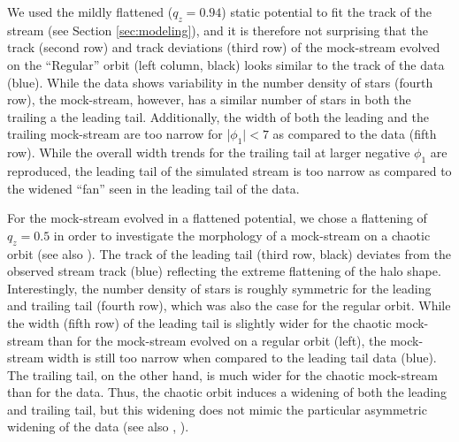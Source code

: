 \documentclass[twocolumn]{aastex62}
\newcommand{\sa}[1]{{\color{magenta} SP: #1}}
\begin{document}
\begin{figure}
{%
}
\label{fig:sims}
\end{figure}


We used the mildly flattened ($q_z = 0.94$) static potential to fit the track of the stream (see Section \ref{sec:modeling}), and it is therefore not surprising that the track (second row) and track deviations (third row) of the mock-stream evolved on the ``Regular'' orbit (left column, black) looks similar to the track of the data (blue).
While the data shows variability in the number density of stars (fourth row), the mock-stream, however, has a similar number of stars in both the trailing a the leading tail.
Additionally, the width of both the leading and the trailing mock-stream are too narrow for |$\phi_1| < 7$ as compared to the data (fifth row).
While the overall width trends for the trailing tail  at larger negative $\phi_1$ are reproduced, the leading tail of the simulated stream is too narrow as compared to the widened ``fan'' seen in the leading tail of the data.

For the mock-stream evolved in a flattened potential,
we chose a flattening of $q_z = 0.5$  in order to investigate the morphology of a mock-stream on a chaotic orbit (see also \citealt{Fardal:2015}).
The track of the leading tail (third row, black) deviates from the observed stream track (blue) reflecting the extreme flattening of the halo shape.
Interestingly, the number density of stars is roughly symmetric for the leading and trailing tail  (fourth row), which was also the case for the regular orbit.
While the width (fifth row) of the leading tail is slightly wider for the chaotic mock-stream than for the mock-stream evolved on a regular orbit (left), the mock-stream width is still too narrow when compared to the leading tail data (blue).
The trailing tail, on the other hand, is much wider for the chaotic mock-stream than for the data.
Thus, the chaotic orbit induces a widening of both the leading and trailing tail, but this widening does not mimic the particular asymmetric widening of the data (see also \citealt{Pearson:2015}, \citealt{Price-Whelan:2016}).
\end{document}
